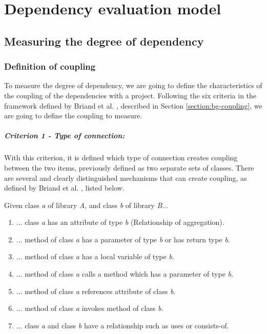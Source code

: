 \chapter{Dependency evaluation model}\label{ch:TheoreticModel}

\section{Measuring the degree of dependency}\label{sect:degree-dependency}
\subsection{Definition of coupling}\label{subsect:defCoupling}
To measure the degree of dependency, we are going to define the characteristics of the coupling of the dependencies with a project. Following the six criteria in the framework defined by Briand et al. \cite{briand1999unified}, described in Section \ref{section:bg-coupling}, we are going to define the coupling to measure.

\paragraph{Criterion 1 - Type of connection:}
With this criterion, it is defined which type of connection creates coupling between the two items, previously defined as two separate sets of classes. There are several and clearly distinguished mechanisms that can create coupling, as defined by Briand et al. \cite{briand1999unified}, listed below.

\blankls
Given class \textit{a} of library \textit{A}, and class \textit{b} of library \textit{B}...

\begin{enumerate}
  \item ... class \textit{a} has an attribute of type \textit{b} (Relationship of aggregation).
  \item ... method of class \textit{a} has a parameter of type \textit{b} or has return type \textit{b}.
  \item ... method of class \textit{a} has a local variable of type \textit{b}.
  \item ... method of class \textit{a} calls a method which has a parameter of type \textit{b}.
  \item ... method of class \textit{a} references attribute of class \textit{b}.
  \item ... method of class \textit{a} invokes method of class \textit{b}.
  \item ... class \textit{a} and class \textit{b} have a relationship such as uses or consists-of.
\end{enumerate}


